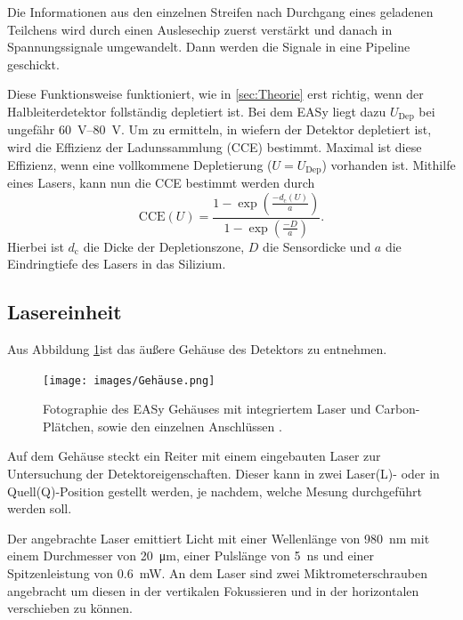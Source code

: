 Die Informationen aus den einzelnen Streifen nach Durchgang eines geladenen
Teilchens wird durch einen Auslesechip zuerst verstärkt und danach in
Spannungssignale umgewandelt. Dann werden die Signale in eine Pipeline geschickt.

Diese Funktionsweise funktioniert, wie in \ref{sec:Theorie} erst richtig, wenn der
Halbleiterdetektor follständig depletiert ist. Bei dem EASy liegt dazu
$U_\text{Dep}$ bei ungefähr \SIrange{60}{80}{\volt}. Um zu ermitteln, in wiefern der Detektor depletiert ist, wird die Effizienz der Ladunssammlung (CCE) bestimmt. Maximal ist diese Effizienz, wenn eine vollkommene Depletierung ($U = U_\text{Dep}$) vorhanden ist. Mithilfe eines Lasers, kann nun die CCE bestimmt werden durch
\begin{equation}
  \text{CCE}(U) = \frac{1 - \exp\left(\frac{-d_\text{c}(U)}{a}\right)}{1 - \exp\left(\frac{-D}{a}\right)}.
\end{equation}
Hierbei ist $d_\text{c}$ die Dicke der Depletionszone, $D$ die Sensordicke und $a$ die Eindringtiefe des Lasers in das Silizium.

\subsection{Lasereinheit}
\label{sec:Lasereinheit}
Aus Abbildung \ref{fig:Gehäuse}ist das äußere Gehäuse des Detektors zu entnehmen.
\begin{figure}[htb]
  \centering
  \texttt{[image: images/Gehäuse.png]}
  \caption{Fotographie des EASy Gehäuses mit integriertem Laser und Carbon-Plätchen, sowie den einzelnen Anschlüssen \cite{anleitung}.}
  \label{fig:Gehäuse}
\end{figure}
Auf dem Gehäuse steckt ein Reiter mit einem eingebauten Laser zur Untersuchung der
Detektoreigenschaften. Dieser kann in zwei Laser(L)- oder in Quell(Q)-Position gestellt werden, je nachdem, welche Mesung durchgeführt werden soll.

Der angebrachte Laser emittiert Licht mit einer Wellenlänge von \SI{980}{\nano\meter} mit einem Durchmesser von \SI{20}{\micro\meter}, einer Pulslänge von \SI{5}{\nano\second} und einer Spitzenleistung von \SI{0.6}{\milli\watt}.
An dem Laser sind zwei Miktrometerschrauben angebracht um diesen in der vertikalen Fokussieren und in der horizontalen verschieben zu können.

